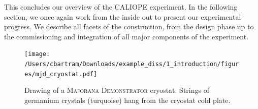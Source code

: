 This concludes our overview of the CALIOPE experiment. In the following section, we once again work from the inside out to present our experimental progress. We describe all facets of the construction, from the design phase up to the commissioning and integration of all major components of the experiment.


\begin{figure}[htbp]
\centering
\texttt{[image: /Users/cbartram/Downloads/example\_diss/1\_introduction/figures/mjd\_cryostat.pdf]}
\caption[%
\textsc{Majorana Demonstrator} cryostat drawing
]{%
Drawing of a \textsc{Majorana Demonstrator} cryostat. Strings of germanium crystals (turquoise) hang from the cryostat cold plate.
\label{fig:mjd_cryostat}} 
\end{figure}

